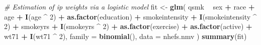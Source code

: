 \documentclass[
  10pt,
]{book}
\newenvironment{Shaded}{\begin{snugshade}}{\end{snugshade}}
\newcommand{\CommentTok}[1]{\textcolor[rgb]{0.56,0.35,0.01}{\textit{#1}}}
\newcommand{\DataTypeTok}[1]{\textcolor[rgb]{0.13,0.29,0.53}{#1}}
\newcommand{\DecValTok}[1]{\textcolor[rgb]{0.00,0.00,0.81}{#1}}
\newcommand{\KeywordTok}[1]{\textcolor[rgb]{0.13,0.29,0.53}{\textbf{#1}}}
\newcommand{\NormalTok}[1]{#1}
\newcommand{\OperatorTok}[1]{\textcolor[rgb]{0.81,0.36,0.00}{\textbf{#1}}}
\newcommand{\StringTok}[1]{\textcolor[rgb]{0.31,0.60,0.02}{#1}}
\begin{document}
\begin{Shaded}
\begin{Highlighting}[]
\CommentTok{# Estimation of ip weights via a logistic model}
\NormalTok{fit <-}\StringTok{ }\KeywordTok{glm}\NormalTok{(}
\NormalTok{  qsmk }\OperatorTok{~}\StringTok{ }\NormalTok{sex }\OperatorTok{+}\StringTok{ }\NormalTok{race }\OperatorTok{+}\StringTok{ }\NormalTok{age }\OperatorTok{+}\StringTok{ }\KeywordTok{I}\NormalTok{(age }\OperatorTok{^}\StringTok{ }\DecValTok{2}\NormalTok{) }\OperatorTok{+}
\StringTok{    }\KeywordTok{as.factor}\NormalTok{(education) }\OperatorTok{+}\StringTok{ }\NormalTok{smokeintensity }\OperatorTok{+}
\StringTok{    }\KeywordTok{I}\NormalTok{(smokeintensity }\OperatorTok{^}\StringTok{ }\DecValTok{2}\NormalTok{) }\OperatorTok{+}\StringTok{ }\NormalTok{smokeyrs }\OperatorTok{+}\StringTok{ }\KeywordTok{I}\NormalTok{(smokeyrs }\OperatorTok{^}\StringTok{ }\DecValTok{2}\NormalTok{) }\OperatorTok{+}
\StringTok{    }\KeywordTok{as.factor}\NormalTok{(exercise) }\OperatorTok{+}\StringTok{ }\KeywordTok{as.factor}\NormalTok{(active) }\OperatorTok{+}\StringTok{ }\NormalTok{wt71 }\OperatorTok{+}\StringTok{ }\KeywordTok{I}\NormalTok{(wt71 }\OperatorTok{^}\StringTok{ }\DecValTok{2}\NormalTok{),}
  \DataTypeTok{family =} \KeywordTok{binomial}\NormalTok{(),}
  \DataTypeTok{data =}\NormalTok{ nhefs.nmv}
\NormalTok{)}
\KeywordTok{summary}\NormalTok{(fit)}
\end{Highlighting}
\end{Shaded}
\end{document}
